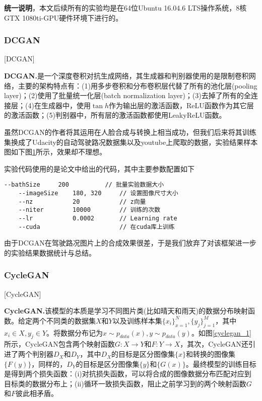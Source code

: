 \textbf{统一说明}，本文后续所有的实验均是在64位Ubuntu 16.04.6 LTS操作系统，8核GTX 1080ti-GPU硬件环境下进行的。

\subsubsection{DCGAN}[DCGAN]

\textbf{DCGAN.}\cite{dcgan}\quad 是一个深度卷积对抗生成网络，其生成器和判别器使用的是限制卷积网络，主要的架构特点有：(1)用多步卷积和分布卷积层代替了所有的池化层(pooling layer)；(2)使用了批量统一化层(batch normalization layer)；(3)去掉了所有的全连接层；(4)在生成器中，使用$\tan{h}$作为输出层的激活函数，ReLU函数作为其它层的激活函数；(5)判别器中，所有层的激活函数都使用LeakyReLU函数。

虽然DCGAN的作者将其运用在人脸合成与转换上相当成功，但我们后来将其训练集换成了Udacity的自动驾驶路况数据集以及youtube上爬取的数据，实验结果样本图如下图\ref{dcgan_example}所示，效果却不理想。

\begin{figure}[t]
    \centering
    \caption{}
    \label{dcgan_example}
\end{figure}

实验代码使用的是\cite{dcgan}论文中给出的代码，其中主要参数配置如下

\begin{lstlisting}[basicstyle=\small]
    --bathSize     200          // 批量实验数据大小
    --imageSize    180, 320     // 设置图像尺寸大小
    --nz           20           // z向量
    --niter        10000        // 训练的次数
    --lr           0.0002       // Learning rate
    --cuda                      // 在cuda库上训练
\end{lstlisting}

由于DCGAN在驾驶路况图片上的合成效果很差，于是我们放弃了对该框架进一步的实验结果数据统计与总结。


\subsubsection{CycleGAN}[CycleGAN]

\textbf{CycleGAN.}\cite{CycleGAN}\quad 该模型的本质是学习不同图片类(比如晴天和雨天)的数据分布映射函数。给定两个不同类的数据集$X$和$Y$以及训练样本集$\{x_i\}_{x=1}^N, \{y_j\}_{j=1}^M$，其中$x_i\in X, y_j\in Y$。将数据分布记为$x\sim p_{data}(x), y\sim p_{data}(y)$。如图\ref{cyclegan_1}所示，CycleGAN包含两个映射函数$G: X\to Y$和$F: Y\to X$，其次，CycleGAN还引进了两个判别器$D_X$和$D_Y$，其中$D_X$的目标是区分图像集$\{x\}$和转换的图像集$\{F(y)\}$，同样的，$D_Y$的目标是区分图像集$\{y\}$和$\{G(x)\}$。最终模型的训练目标是得到两个损失函数：(i)对抗损失函数，可以将合成的图像数据分布匹配对应到目标类的数据分布上；(ii)循环一致损失函数，阻止之前学习到的两个映射函数$G$和$F$彼此相矛盾。

